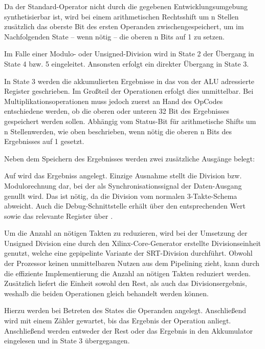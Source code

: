 Da der Standard-Operator  nicht durch die gegebenen Entwicklungsumgebung synthetisierbar ist, wird bei einem arithmetischen Rechtsshift um {n} Stellen zusätzlich das oberste Bit des ersten Operanden zwischengespeichert, um im Nachfolgenden State – wenn n\"otig – die oberen {n} Bits auf {1} zu setzen.\vspace{10}

Im Falle einer Modulo- oder Unsigned-Division wird in State 2 der \"Ubergang in State 4 bzw. 5 eingeleitet. Ansonsten erfolgt ein direkter \"Ubergang in State 3.

In State 3 werden die akkumulierten Ergebnisse in das von der ALU adressierte Register geschrieben.
Im Großteil der Operationen erfolgt dies unmittelbar. Bei Multiplikationsoperationen muss jedoch zuerst an Hand des OpCodes entschiedene werden, ob die oberen oder unteren 32 Bit des Ergebnisses gespeichert werden sollen. Abhängig vom Status-Bit f\"ur arithmetische Shifts um {n} Stellenwerden, wie oben beschrieben, wenn n\"otig die oberen n Bits des Ergebnisses auf {1} gesetzt.\vspace{10}

Neben dem Speichern des Ergebnisses werden zwei zusätzliche Ausgänge belegt:

Auf  wird das Ergebniss angelegt. Einzige Ausnahme stellt die Division bzw. Modulorechnung dar, bei der als Synchronisationssignal der Daten-Ausgang genullt wird. Das ist n\"otig, da die Division vom normalen 3-Takte-Schema abweicht.
Auch die Debug-Schnittstelle erhält \"uber  den entsprechenden Wert sowie das relevante Register \"uber .

Um die Anzahl an n\"otigen Takten zu reduzieren, wird bei der Umsetzung der Unsigned Division eine durch den Xilinx-Core-Generator erstellte Divisionseinheit genutzt, welche eine gepipelinte Variante der SRT-Division durchf\"uhrt. Obwohl der Prozessor keinen unmittelbaren Nutzen aus dem Pipelining zieht, kann durch die effiziente Implementierung die Anzahl an n\"otigen Takten reduziert werden. Zusätzlich liefert die Einheit sowohl den Rest, als auch das Divisionsergebnis, weshalb die beiden Operationen gleich behandelt werden k\"onnen.

Hierzu werden bei Betreten des States die Operanden angelegt. Anschließend wird mit einem Zähler gewartet, bis das Ergebnis der Operation anliegt.
Anschließend werden entweder der Rest oder das Ergebnis in den Akkumulator eingelesen und in State 3 \"ubergegangen.

